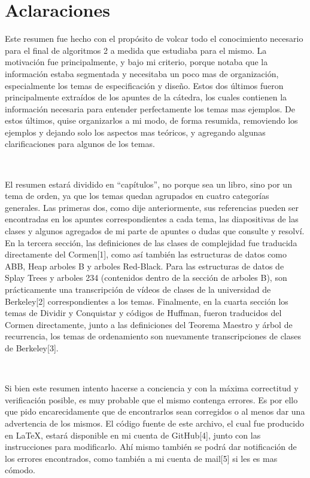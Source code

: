 \documentclass[10pt, a4paper]{report}
\begin{document}
\newpage

\chapter*{Aclaraciones}

Este resumen fue hecho con el prop\'osito de volcar todo el conocimiento necesario para el final de algoritmos 2 a medida que estudiaba para el mismo. La motivaci\'on fue principalmente, y bajo mi criterio, porque notaba que la informaci\'on estaba segmentada y necesitaba un poco mas de organizaci\'on, especialmente los temas de especificaci\'on y dise\~no. Estos dos \'ultimos fueron principalmente extra\'idos de los apuntes de la c\'atedra, los cuales contienen la informaci\'on necesaria para entender perfectamente los temas mas ejemplos. De estos \'ultimos, quise organizarlos a mi modo, de forma resumida, removiendo los ejemplos y dejando solo los aspectos mas te\'oricos, y agregando algunas clarificaciones para algunos de los temas.

~

El resumen estar\'a dividido en ``cap\'itulos'', no porque sea un libro, sino por un tema de orden, ya que los temas quedan agrupados en cuatro categor\'ias generales. Las primeras dos, como dije anteriormente, sus referencias pueden ser encontradas en los apuntes correspondientes a cada tema, las diapositivas de las clases y algunos agregados de mi parte de apuntes o dudas que consulte y resolv\'i. En la tercera secci\'on, las definiciones de las clases de complejidad fue traducida directamente del Cormen[1], como as\'i tambi\'en las estructuras de datos como ABB, Heap arboles B y arboles Red-Black. Para las estructuras de datos de Splay Trees y arboles 234 (contenidos dentro de la secci\'on de arboles B), son pr\'acticamente una transcripci\'on de v\'ideos de clases de la universidad de Berkeley[2] correspondientes a los temas. Finalmente, en la cuarta secci\'on los temas de Dividir y Conquistar y c\'odigos de Huffman, fueron traducidos del Cormen directamente, junto a las definiciones del Teorema Maestro y \'arbol de recurrencia, los temas de ordenamiento son nuevamente transcripciones de clases de Berkeley[3].

~

Si bien este resumen intento hacerse a conciencia y con la m\'axima correctitud y verificaci\'on posible, es muy probable que el mismo contenga errores. Es por ello que pido encarecidamente que de encontrarlos sean corregidos o al menos dar una advertencia de los mismos. El c\'odigo fuente de este archivo, el cual fue producido en LaTeX, estar\'a disponible en mi cuenta de GitHub[4], junto con las instrucciones para modificarlo. Ah\'i mismo tambi\'en se podr\'a dar notificaci\'on de los errores encontrados, como tambi\'en a mi cuenta de mail[5] si les es mas c\'omodo.
\end{document}
